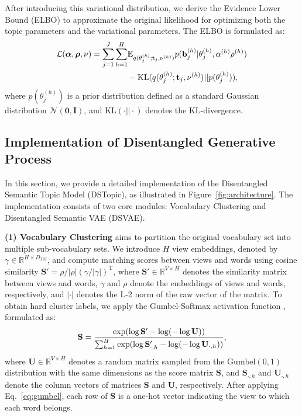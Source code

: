 After introducing this variational distribution, we derive the Evidence Lower Bound (ELBO) to approximate the original likelihood for optimizing both the topic parameters and the variational parameters. The ELBO is formulated as:
\begin{align}
    \mathcal{L}(\bm{\alpha}, \bm{\rho}, \nu) = \sum_{j=1}^J \sum_{h=1}^H &\mathbb{E}_{q(\theta_j^{(h)}; \mathbf{t}_j, \nu^{(h)})} p(\mathbf{b}_j^{(h)} | \theta_j^{(h)}, \alpha^{(h)} \rho^{(h)})  \notag \\
    &- \text{KL}(q(\theta_j^{(h)}; \mathbf{t}_j, \nu^{(h)}) || p(\theta_j^{(h)})),
    \label{eq:elbo}
\end{align}
where $ p(\theta_j^{(h)}) $ is a prior distribution defined as a standard Gaussian distribution $ \mathcal{N}(\mathbf{0}, \mathbf{I}) $, and $\text{KL}(\cdot ||\cdot)$ denotes the KL-divergence.


\subsection{Implementation of Disentangled Generative Process}
In this section, we provide a detailed implementation of the Disentangled Semantic Topic Model (DSTopic), as illustrated in Figure~\ref{fig:architecture}. The implementation consists of two core modules: Vocabulary Clustering and Disentangled Semantic VAE (DSVAE).

\noindent \textbf{(1) Vocabulary Clustering} aims to partition the original vocabulary set into multiple sub-vocabulary sets. We introduce $H$ view embeddings, denoted by $\gamma \in \mathbb{R}^{H \times D_{TM}}$, and compute matching scores between views and words using cosine similarity  $\mathbf{S}' = \rho / |\rho| \left(\gamma /|\gamma|\right)^{\mathrm{T}}$,
where $\mathbf{S}' \in \mathbb{R}^{V \times H}$ denotes the similarity matrix between views and words, $\gamma$ and $\rho$ denote the embeddings of views and words, respectively, and $|\cdot|$ denotes the L-2 norm of the raw vector of the matrix. To obtain hard cluster labels, we apply the Gumbel-Softmax activation function \cite{jang2016categorical}, formulated as:
\begin{align}
\small
    \mathbf{S} = \frac{\exp(\log \mathbf{S}' - \log(-\log \mathbf{U}))}{\sum_{h=1}^H \exp(\log \mathbf{S}_{\cdot,h}' - \log(-\log \mathbf{U}_{\cdot,h}))} ,
    \label{eq:gumbel}
\end{align}
where $\mathbf{U} \in \mathbb{R}^{V \times H}$ denotes a random matrix sampled from the $\text{Gumbel}(0,1)$ distribution with the same dimensions as the score matrix $\mathbf{S}$, and $\mathbf{S}_{\cdot,h}$ and $\mathbf{U}_{\cdot,h}$ denote the column vectors of matrices $\mathbf{S}$ and $\mathbf{U}$, respectively. After applying Eq.~\ref{eq:gumbel}, each row of $\mathbf{S}$ is a one-hot vector indicating the view to which each word belongs.

